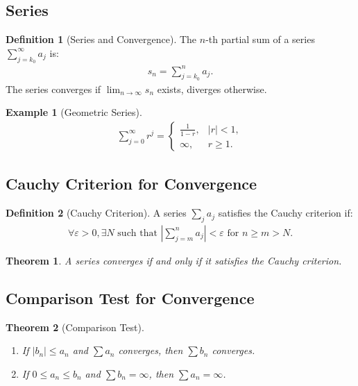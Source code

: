 \documentclass[9pt]{article}
\theoremstyle{definition}
\newtheorem{definition}{Definition}
\theoremstyle{plain}
\newtheorem{theorem}{Theorem}
\newtheorem{example}{Example}
\begin{document}
\subsection*{Series}
\begin{definition}[Series and Convergence]
The $ n $-th partial sum of a series $ \sum_{j=k_0}^\infty a_j $ is:
\begin{align}
s_n = \sum_{j=k_0}^n a_j.
\end{align}
The series converges if $ \lim_{n \to \infty} s_n $ exists, diverges otherwise.
\end{definition}

\begin{example}[Geometric Series]
\begin{align}
\sum_{j=0}^\infty r^j =
\begin{cases} 
\frac{1}{1-r}, & |r| < 1, \\
\infty, & r \geq 1.
\end{cases}
\end{align}
\end{example}

\subsection*{Cauchy Criterion for Convergence}
\begin{definition}[Cauchy Criterion]
A series $ \sum_j a_j $ satisfies the Cauchy criterion if:
\begin{align}
\forall \varepsilon > 0, \exists N \text{ such that } \left| \sum_{j=m}^n a_j \right| < \varepsilon \text{ for } n \geq m > N.
\end{align}
\end{definition}

\begin{theorem}
A series converges if and only if it satisfies the Cauchy criterion.
\end{theorem}

\subsection*{Comparison Test for Convergence}
\begin{theorem}[Comparison Test]

\begin{enumerate}
    \item If $ |b_n| \leq a_n $ and $ \sum a_n $ converges, then $ \sum b_n $ converges.
    \item If $ 0 \leq a_n \leq b_n $ and $ \sum b_n = \infty $, then $ \sum a_n = \infty $.
\end{enumerate}
\end{theorem}
\end{document}
